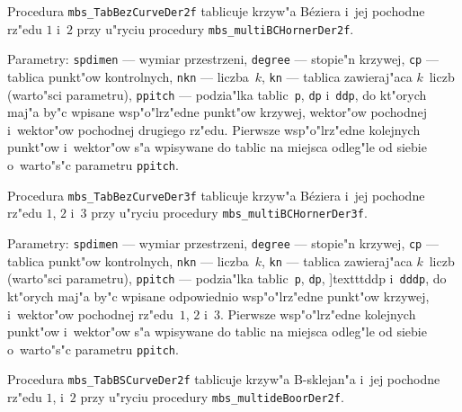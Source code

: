 \vspace{\bigskipamount}
Procedura \texttt{mbs\_TabBezCurveDer2f} tablicuje krzyw"a B\'{e}ziera
i~jej pochodne rz"e\-du $1$ i~$2$ przy u"ryciu procedury
\texttt{mbs\_multiBCHornerDer2f}.

Parametry: \texttt{spdimen} --- wymiar
przestrzeni, \texttt{degree} --- stopie"n krzywej, \texttt{cp} --- tablica
punkt"ow kontrolnych, \texttt{nkn} --- liczba~$k$, \texttt{kn} --- tablica
zawieraj"aca $k$~liczb (warto"sci parametru), \texttt{ppitch} --- podzia"lka
tablic~\texttt{p}, \texttt{dp} i~\texttt{ddp}, do kt"orych maj"a by"c wpisane
wsp"o"lrz"edne punkt"ow krzywej, wektor"ow pochodnej i~wektor"ow pochodnej
drugiego rz"edu. Pierwsze wsp"o"lrz"edne kolejnych punkt"ow i~wektor"ow
s"a wpisywane do tablic na miejsca odleg"le od siebie o~warto"s"c parametru
\texttt{ppitch}.

\vspace{\bigskipamount}
Procedura \texttt{mbs\_TabBezCurveDer3f} tablicuje krzyw"a B\'{e}ziera
i~jej pochodne rz"e\-du $1$, $2$ i~$3$ przy u"ryciu procedury
\texttt{mbs\_multiBCHornerDer3f}.

Parametry: \texttt{spdimen} --- wymiar
przestrzeni, \texttt{degree} --- stopie"n krzywej, \texttt{cp} --- tablica
punkt"ow kontrolnych, \texttt{nkn} --- liczba~$k$, \texttt{kn} --- tablica
zawieraj"aca $k$~liczb (warto"sci parametru), \texttt{ppitch} --- podzia"lka
tablic~\texttt{p}, \texttt{dp}, ]texttt{ddp} i~\texttt{dddp}, do kt"orych
maj"a by"c wpisane odpowiednio wsp"o"lrz"edne punkt"ow krzywej, i~wektor"ow
pochodnej rz"edu~$1$, $2$ i~$3$. Pierwsze wsp"o"lrz"edne kolejnych punkt"ow
i~wektor"ow s"a wpisywane do tablic na miejsca odleg"le od siebie
o~warto"s"c parametru
\texttt{ppitch}.

\vspace{\bigskipamount}
Procedura \texttt{mbs\_TabBSCurveDer2f} tablicuje krzyw"a B-sklejan"a
i~jej pochodne rz"e\-du $1$, i~$2$ przy u"ryciu procedury
\texttt{mbs\_multideBoorDer2f}.

